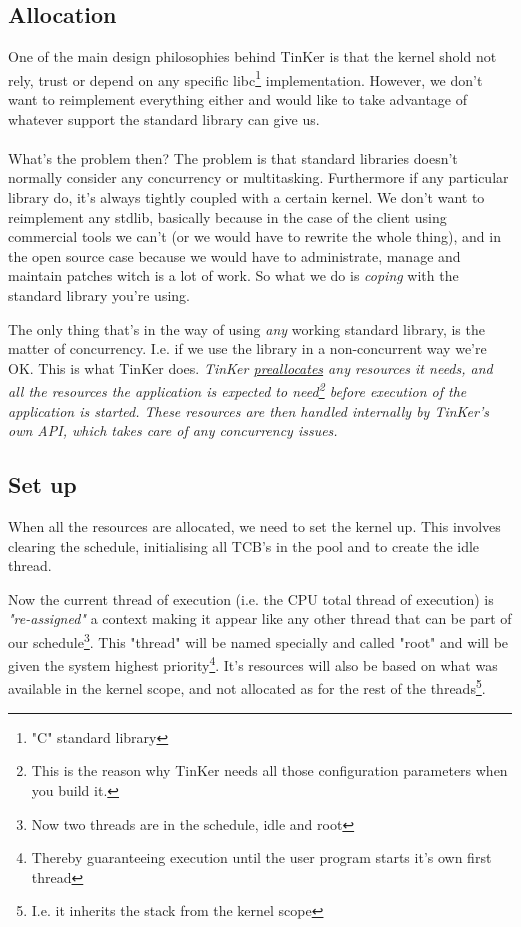 	\subsection{Allocation}
		One of the main design philosophies behind TinKer is that the kernel shold not rely, trust or depend on any specific libc\footnote{"C" standard library} implementation. However, we don't want to reimplement everything either and would like to take advantage of whatever support the standard library can give us.
		\\\\
		What's the problem then? The problem is that standard libraries doesn't normally consider any concurrency or multitasking. Furthermore if any particular library do, it's always tightly coupled with a certain kernel. We don't want to reimplement any stdlib, basically because in the case of the client using commercial tools we can't (or we would have to rewrite the whole thing), and in the open source case because we would have to administrate, manage and maintain patches witch is a lot of work. So what we do is \textit{coping} with the standard library you're using.

		The only thing that's in the way of using \textit{any} working standard library, is the matter of concurrency. I.e. if we use the library in a non-concurrent way we're OK. This is what TinKer does. \textit{TinKer \underline{preallocates} any resources it needs, and all the resources the application is expected to need\footnote{This is the reason why TinKer needs all those configuration parameters when you build it.} before execution of the application is started. These resources are then handled internally by TinKer's own API, which takes care of any concurrency issues.}

	\subsection{Set up}
		When all the resources are allocated, we need to set the kernel up. This involves clearing the schedule, initialising all TCB's in the pool and to create the idle thread.

		Now the current thread of execution (i.e. the CPU total thread of execution) is \textit{"re-assigned"} a context making it appear like any other thread that can be part of our schedule\footnote{Now two threads are in the schedule, idle and root}. This "thread" will be named specially and called "root" and will be given the system highest priority\footnote{Thereby guaranteeing execution until the user program starts it's own first thread}. It's resources will also be based on what was available in the kernel scope, and not allocated as for the rest of the threads\footnote{I.e. it inherits the stack from the kernel scope}.

